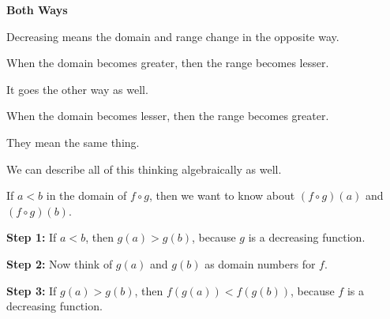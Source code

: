 \documentclass{ximera}
\begin{document}
\begin{warning} \textbf{\textcolor{red!70!black}{Both Ways}}

Decreasing means the domain and range change in the opposite way.

When the domain becomes greater, then the range becomes lesser.

It goes the other way as well.

When the domain becomes lesser, then the range becomes greater.

They mean the same thing.


\end{warning}






We can describe all of this thinking algebraically as well. 


If $a < b$ in the domain of $f \circ g$, then we want to know about $(f \circ g)(a)$  and $(f \circ g)(b)$.



\textbf{Step 1:}  If $a < b$, then $g(a) > g(b)$, because $g$ is a decreasing function.


\textbf{Step 2:}  Now think of $g(a)$ and $g(b)$ as domain numbers for $f$.


\textbf{Step 3:}  If $g(a) > g(b)$, then $f(g(a)) < f(g(b))$, because $f$ is a decreasing function.
\end{document}
